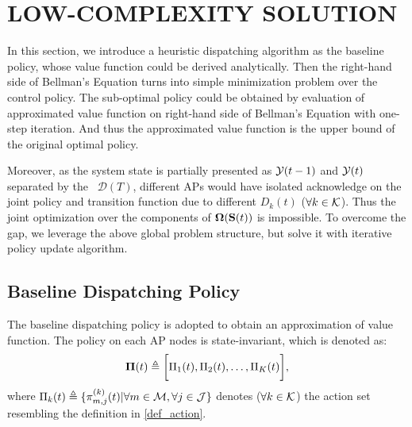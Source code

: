 \section{LOW-COMPLEXITY SOLUTION}
In this section, we introduce a heuristic dispatching algorithm as the baseline policy, whose value function could be derived analytically.
Then the right-hand side of Bellman's Equation turns into simple minimization problem over the control policy. The sub-optimal policy could be obtained by evaluation of approximated value function on right-hand side of Bellman's Equation with one-step iteration. And thus the approximated value function is the upper bound of the original optimal policy.

Moreover, as the system state is partially presented as $\mathcal{Y}({t-1})$ and $\mathcal{Y}({t})$ separated by the \brdelay~$\mathcal{D}(T)$, different APs would have isolated acknowledge on the joint policy and transition function due to different $D_k(t)$ ($\forall k\in\mathcal{K}$).
Thus the joint optimization over the components of $\boldsymbol{\Omega}(\mathbf{S}({t}))$ is impossible.
To overcome the gap, we leverage the above global problem structure, but solve it with iterative policy update algorithm.


\subsection{Baseline Dispatching Policy}
The baseline dispatching policy is adopted to obtain an approximation of value function. The policy on each AP nodes is state-invariant, which is denoted as:
\begin{align}
    \boldsymbol{\Pi}({t}) \triangleq \bigg[\Pi_1({t}), \Pi_2({t}), \dots, \Pi_K({t})\bigg],
\end{align}
where $\Pi_k({t}) \triangleq \{\pi^{(k)}_{m,j}({t}) | \forall m\in\mathcal{M},\forall j\in\mathcal{J}\}$ denotes ($\forall k\in\mathcal{K}$) the action set resembling the definition in \ref{def_action}.


